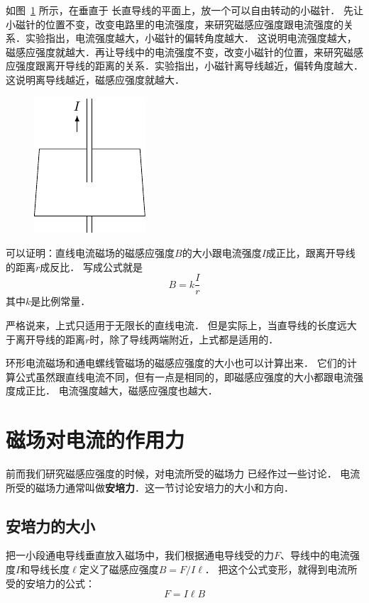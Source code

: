 如图~\ref{fig_C_1-20} 所示，在垂直于
长直导线的平面上，放一个可以自由转动的小磁针．
先让小磁针的位置不变，改变电路里的电流强度，来研究磁感应强度跟电流强度的关系．实验指出，电流强度越大，小磁针的偏转角度越大．
这说明电流强度越大，磁感应强度就越大．再让导线中的电流强度不变，改变小磁针的位置，来研究磁感应强度跟离开导线的距离的关系．实验指出，小磁针离导线越近，偏转角度越大．这说明离导线越近，磁感应强度就越大．
\begin{figure}[htbp]
	\centering
	\includegraphics{fig/C/1-20.pdf}
	\caption{ }\label{fig_C_1-20}
\end{figure}


可以证明：直线电流磁场的磁感应强度$B$的大小跟电流强度$I$成正比，跟离开导线的距离$r$成反比．
写成公式就是
\[B=k\frac{I}{r}\]
其中$k$是比例常量．

严格说来，上式只适用于无限长的直线电流．
但是实际上，当直导线的长度远大于离开导线的距离$r$时，除了导线两端附近，上式都是适用的．

环形电流磁场和通电螺线管磁场的磁感应强度的大小也可以计算出来．
它们的计算公式虽然跟直线电流不同，但有一点是相同的，即磁感应强度的大小都跟电流强度成正比．
电流强度越大，磁感应强度也越大．

\section{磁场对电流的作用力}
前而我们研究磁感应强度的时候，对电流所受的磁场力
已经作过一些讨论．
电流所受的磁场力通常叫做\textbf{安培力}．这一节讨论安培力的大小和方向．

\subsection{安培力的大小}

把一小段通电导线垂直放入磁场中，我们根据通电导线受的力$F$、导线中的电流强度$I$和导线长度$\ell$定义了磁感应强度$B=F/I\ell$．
把这个公式变形，就得到电流所受的安培力的公式：
\[F=I\ell B\]

